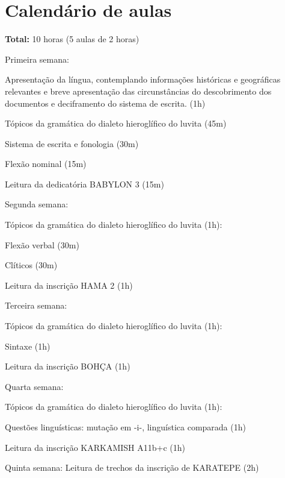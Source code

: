 \documentclass[article,12pt]{memoir}
\begin{document}
\chapter{Calendário de aulas}

\textbf{Total:} 10 horas (5 aulas de 2 horas)

\begin{compactitem}
	\item Primeira semana:
	\begin{compactitem}
		\item Apresentação da língua, contemplando informações históricas e
		geográficas relevantes e breve apresentação das circunstâncias do
		descobrimento dos documentos e deciframento do sistema de escrita.
		(1h)
		\item Tópicos da gramática do dialeto hieroglífico do luvita (45m)

		\begin{compactitem}
			\item Sistema de escrita e fonologia (30m)
			\item Flexão nominal (15m)
		\end{compactitem}
		\item Leitura da dedicatória BABYLON 3 (15m)
	\end{compactitem}
	\item Segunda semana:

	\begin{compactitem}
		\item Tópicos da gramática do dialeto hieroglífico do luvita (1h):
		\begin{compactitem}
			\item Flexão verbal (30m)
			\item Clíticos (30m)
		\end{compactitem}
		\item Leitura da inscrição HAMA 2 (1h)
	\end{compactitem}
	\item Terceira semana:
	\begin{compactitem}
		\item Tópicos da gramática do dialeto hieroglífico do luvita (1h):
		\begin{compactitem}
			\item Sintaxe (1h)
		\end{compactitem}
		\item Leitura da inscrição BOHÇA (1h)
	\end{compactitem}
	\item Quarta semana:
	\begin{compactitem}
		\item Tópicos da gramática do dialeto hieroglífico do luvita (1h):
		\begin{compactitem}
			\item Questões linguísticas: mutação em -i-, linguística comparada (1h)
		\end{compactitem}
		\item Leitura da inscrição KARKAMISH A11b+c (1h)
	\end{compactitem}
	\item Quinta semana: Leitura de trechos da inscrição de KARATEPE (2h)
\end{compactitem}


\nocite{
	Velhartická2016,
	Payne2010,
	Payne2012,
	CHLI_1_1,
	CHLI_1_2,
	CHLI_1_3,
	CHLI_2,
	CHLI_3,
	Mouton2013,
	Yakubovich2010,
	Melchert2003,
	Bauer2013
}

\printbibliography%
\end{document}
